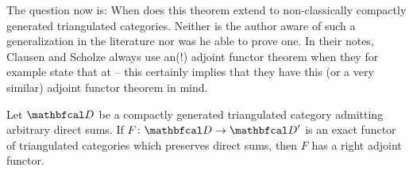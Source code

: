 The question now is: When does this theorem extend to non-classically compactly generated triangulated categories. Neither is the author aware of such a generalization in the literature nor was he able to prove one. In their notes, Clausen and Scholze always use an(!) adjoint functor theorem  when they for example state that  at \cite[p. 57]{condenseddotpdf} -- this certainly implies that they have this (or a very similar) adjoint functor theorem in mind.
\begin{assumption}
	\label{assumption: another adjoint functor theorem}

	Let $\category{D}$ be a compactly generated triangulated category admitting arbitrary direct sums. If $F\colon \category D \to \category D'$ is an exact functor of triangulated categories which preserves direct sums, then $F$ has a right adjoint functor.
\end{assumption}
